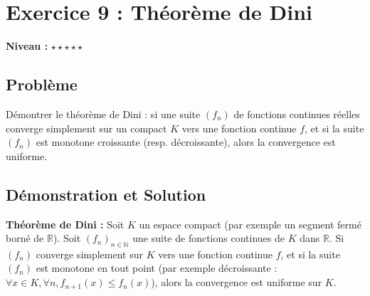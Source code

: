 \documentclass{report}
\begin{document}
\newpage


\chapter*{Exercice 9 : Théorème de Dini}

\textbf{Niveau :} $\star \star \star \star \star $

\section*{Problème}

Démontrer le théorème de Dini : si une suite $(f_n)$ de fonctions continues réelles converge simplement sur un compact $K$ vers une fonction continue $f$, et si la suite $(f_n)$ est monotone croissante (resp. décroissante), alors la convergence est uniforme.

\section*{Démonstration et Solution}

\textbf{Théorème de Dini :} Soit $K$ un espace compact (par exemple un segment fermé borné de $\mathbb{R}$). Soit $(f_n)_{n \in \mathbb{N}}$ une suite de fonctions continues de $K$ dans $\mathbb{R}$. Si $(f_n)$ converge simplement sur $K$ vers une fonction continue $f$, et si la suite $(f_n)$ est monotone en tout point (par exemple décroissante : $\forall x \in K, \forall n, f_{n+1}(x) \leq f_n(x)$), alors la convergence est uniforme sur $K$.
\end{document}
